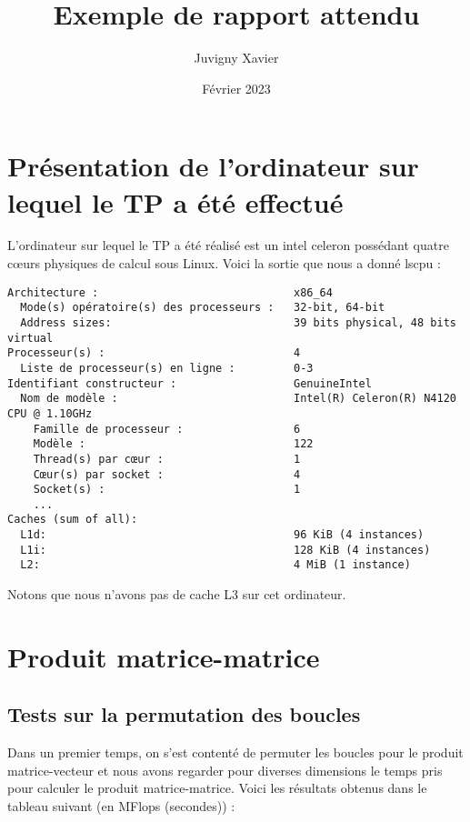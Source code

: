 \documentclass[fleqn,11pt]{article}
\title{Exemple de rapport attendu}
\author{Juvigny Xavier}
\date{Février 2023}
\begin{document}
\maketitle

\section{Présentation de l'ordinateur sur lequel le TP a été effectué}

L'ordinateur sur lequel le TP a été réalisé est un intel celeron possédant quatre c{\oe}urs physiques de calcul sous Linux. Voici la sortie 
que nous a donné lscpu :

\begin{verbatim}
Architecture :                              x86_64
  Mode(s) opératoire(s) des processeurs :   32-bit, 64-bit
  Address sizes:                            39 bits physical, 48 bits virtual
Processeur(s) :                             4
  Liste de processeur(s) en ligne :         0-3
Identifiant constructeur :                  GenuineIntel
  Nom de modèle :                           Intel(R) Celeron(R) N4120 CPU @ 1.10GHz
    Famille de processeur :                 6
    Modèle :                                122
    Thread(s) par cœur :                    1
    Cœur(s) par socket :                    4
    Socket(s) :                             1
    ...
Caches (sum of all):                        
  L1d:                                      96 KiB (4 instances)
  L1i:                                      128 KiB (4 instances)
  L2:                                       4 MiB (1 instance)
\end{verbatim}

Notons que nous n'avons pas de cache L3 sur cet ordinateur.

\section{Produit matrice-matrice}

\subsection{Tests sur la permutation des boucles}

Dans un premier temps, on s'est contenté de permuter les boucles pour le produit matrice-vecteur et nous avons regarder pour diverses
dimensions le temps pris pour calculer le produit matrice-matrice. Voici les résultats obtenus dans le tableau suivant (en MFlops (secondes)) :
\end{document}
